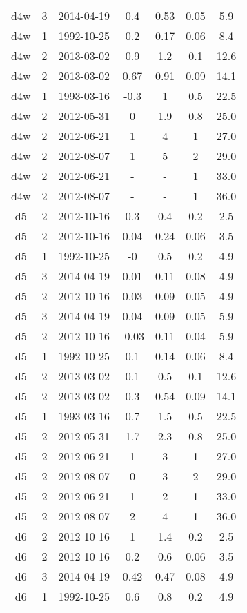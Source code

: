 \begin{longtable}{ccccccc}
d4w & 3 & 2014-04-19 & 0.4 & 0.53 & 0.05 & 5.9 \\
d4w & 1 & 1992-10-25 & 0.2 & 0.17 & 0.06 & 8.4 \\
d4w & 2 & 2013-03-02 & 0.9 & 1.2 & 0.1 & 12.6 \\
d4w & 2 & 2013-03-02 & 0.67 & 0.91 & 0.09 & 14.1 \\
d4w & 1 & 1993-03-16 & -0.3 & 1 & 0.5 & 22.5 \\
d4w & 2 & 2012-05-31 & 0 & 1.9 & 0.8 & 25.0 \\
d4w & 2 & 2012-06-21 & 1 & 4 & 1 & 27.0 \\
d4w & 2 & 2012-08-07 & 1 & 5 & 2 & 29.0 \\
d4w & 2 & 2012-06-21 & - & - & 1 & 33.0 \\
d4w & 2 & 2012-08-07 & - & - & 1 & 36.0 \\
d5 & 2 & 2012-10-16 & 0.3 & 0.4 & 0.2 & 2.5 \\
d5 & 2 & 2012-10-16 & 0.04 & 0.24 & 0.06 & 3.5 \\
d5 & 1 & 1992-10-25 & -0 & 0.5 & 0.2 & 4.9 \\
d5 & 3 & 2014-04-19 & 0.01 & 0.11 & 0.08 & 4.9 \\
d5 & 2 & 2012-10-16 & 0.03 & 0.09 & 0.05 & 4.9 \\
d5 & 3 & 2014-04-19 & 0.04 & 0.09 & 0.05 & 5.9 \\
d5 & 2 & 2012-10-16 & -0.03 & 0.11 & 0.04 & 5.9 \\
d5 & 1 & 1992-10-25 & 0.1 & 0.14 & 0.06 & 8.4 \\
d5 & 2 & 2013-03-02 & 0.1 & 0.5 & 0.1 & 12.6 \\
d5 & 2 & 2013-03-02 & 0.3 & 0.54 & 0.09 & 14.1 \\
d5 & 1 & 1993-03-16 & 0.7 & 1.5 & 0.5 & 22.5 \\
d5 & 2 & 2012-05-31 & 1.7 & 2.3 & 0.8 & 25.0 \\
d5 & 2 & 2012-06-21 & 1 & 3 & 1 & 27.0 \\
d5 & 2 & 2012-08-07 & 0 & 3 & 2 & 29.0 \\
d5 & 2 & 2012-06-21 & 1 & 2 & 1 & 33.0 \\
d5 & 2 & 2012-08-07 & 2 & 4 & 1 & 36.0 \\
d6 & 2 & 2012-10-16 & 1 & 1.4 & 0.2 & 2.5 \\
d6 & 2 & 2012-10-16 & 0.2 & 0.6 & 0.06 & 3.5 \\
d6 & 3 & 2014-04-19 & 0.42 & 0.47 & 0.08 & 4.9 \\
d6 & 1 & 1992-10-25 & 0.6 & 0.8 & 0.2 & 4.9 \\

\end{longtable}
